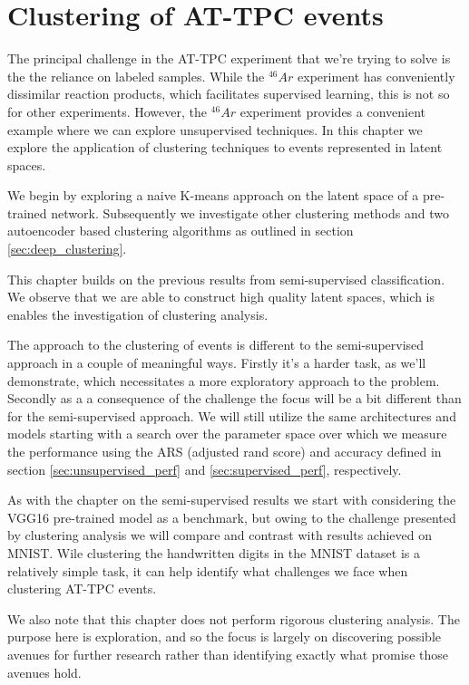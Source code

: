 \chapter{Clustering of AT-TPC events}\label{chap:clustering}

The principal challenge in the AT-TPC experiment that we're trying to solve is the the reliance on labeled samples. While the ${}^{46}Ar$ experiment has conveniently dissimilar reaction products, which facilitates supervised learning, this is not so for other experiments. However, the ${}^{46}Ar$ experiment provides a convenient example where we can explore unsupervised techniques. In this chapter we explore the application of clustering techniques to events represented in latent spaces. 

We begin by exploring a naive K-means approach on the latent space of a pre-trained network. Subsequently we investigate other clustering methods and two autoencoder based clustering algorithms as outlined in section \ref{sec:deep_clustering}.

This chapter builds on the previous results from semi-supervised classification. We observe that we are able to construct high quality latent spaces, which is enables the investigation of clustering analysis. 

The approach to the clustering of events is different to the semi-supervised approach in a couple of meaningful ways. Firstly it's a harder task, as we'll demonstrate, which necessitates a more exploratory approach to the problem. Secondly as a a consequence of the challenge the focus will be a bit different than for the semi-supervised approach. We will still utilize the same architectures and models starting with a search over the parameter space over which we measure the performance using the ARS (adjusted rand score) and accuracy defined in section \ref{sec:unsupervised_perf} and \ref{sec:supervised_perf}, respectively.

As with the chapter on the semi-supervised results we start with considering the VGG16 pre-trained model as a benchmark, but owing to the challenge presented by clustering analysis we will compare and contrast with results achieved on MNIST. Wile clustering the handwritten digits in the MNIST dataset is a relatively simple task, it can help identify what challenges we face when clustering AT-TPC events. 

We also note that this chapter does not perform rigorous clustering analysis. The purpose here is exploration, and so the focus is largely on discovering possible avenues for further research rather than identifying exactly what promise those avenues hold. 